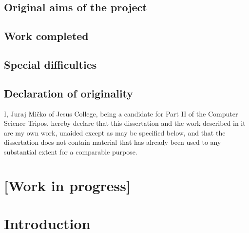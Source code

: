 \documentclass[12pt,a4paper,twoside,openany]{report}
\begin{document}
    \section*{Original aims of the project}



    \section*{Work completed}


    \newpage

    \section*{Special difficulties}



    \section*{Declaration of originality}

    I, Juraj Mi\v{c}ko of Jesus College, being a candidate for Part II of the Computer Science Tripos, hereby declare that this dissertation and the work described in it are my own work, unaided except as may be specified below, and that the dissertation does not contain material that has already been used to any substantial extent for a comparable purpose.

    \bigskip

    \medskip

    \tableofcontents

    \listoffigures

    \listoftables

    \lstlistoflistings


    \pagestyle{headings}


    \chapter*{[Work in progress]}
    


    \chapter{Introduction}\label{ch:introduction}
    
\end{document}
